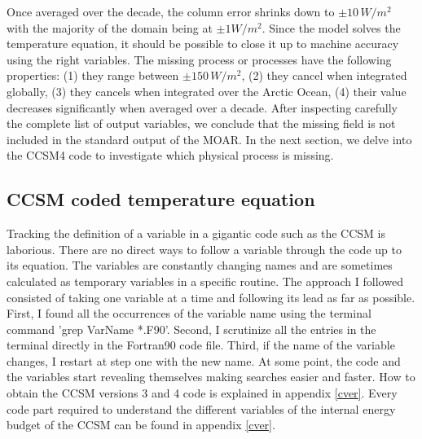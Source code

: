 Once averaged over the decade, the column error shrinks down to $\pm 10 \, W/m^2$ with the majority of the domain being at $\pm 1 W/m^2$. Since the model solves the temperature equation, it should be possible to close it up to machine accuracy using the right variables. The missing process or processes have the following properties: (1) they range between $\pm 150\, W/m^2$, (2) they cancel when integrated globally, (3) they cancels when integrated over the Arctic Ocean, (4) their value decreases significantly when averaged over a decade.  After inspecting carefully the complete list of output variables, we conclude that the missing field is not included in the standard output of the MOAR. In the next section, we delve into the CCSM4 code to investigate which physical process is missing. 


\subsection{CCSM coded temperature equation}\label{code}

Tracking the definition of a variable in a gigantic code such as the CCSM is laborious. There are no direct ways to follow a variable through the code up to its equation. The variables are constantly changing names and are sometimes calculated as temporary variables in a specific routine. The approach I followed consisted of taking one variable at a time and following its lead as far as possible. First, I found all the occurrences of the variable name using the terminal command 'grep VarName *.F90'. Second, I scrutinize all the entries in the terminal directly in the Fortran90 code file. Third, if the name of the variable changes, I restart at step one with the new name.  At some point, the code and the variables start revealing themselves making searches easier and faster. How to obtain the CCSM versions 3 and 4 code is explained in appendix \ref{cver}. Every code part required to understand the different variables of the internal energy budget of the CCSM can be found in appendix \ref{cver}.  

